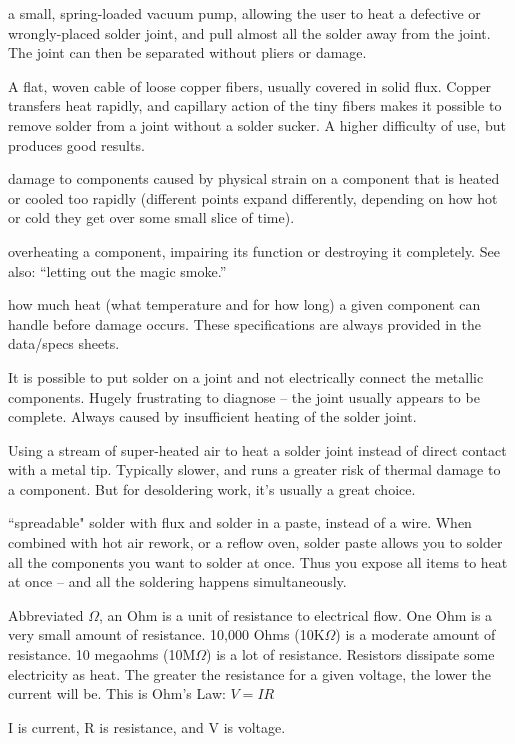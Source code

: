 \documentclass[12pt]{article}
\begin{document}
\begin{description}
 a small, spring-loaded vacuum pump, allowing the user to heat a defective or wrongly-placed solder joint, and pull almost all the solder away from the joint. The joint can then be separated without pliers or damage.

 A flat, woven cable of loose copper fibers, usually covered in solid flux. Copper transfers heat rapidly, and capillary action of the tiny fibers makes it possible to remove solder from a joint without a solder sucker. A higher difficulty of use, but produces good results.

 damage to components caused by physical strain on a component that is heated or cooled too rapidly (different points expand differently, depending on how hot or cold they get over some small slice of time).

 overheating a component, impairing its function or destroying it completely. See also: ``letting out the magic smoke.''

 how much heat (what temperature and for how long) a given component can handle before damage occurs. These specifications are always provided in the data/specs sheets.

 It is possible to put solder on a joint and not electrically connect the metallic components. Hugely frustrating to diagnose -- the joint usually appears to be complete. Always caused by insufficient heating of the solder joint. 

 Using a stream of super-heated air to heat a solder joint instead of direct contact with a metal tip. Typically slower, and runs a greater risk of thermal damage to a component. But for desoldering work, it's usually a great choice.

 ``spreadable" solder with flux and solder in a paste, instead of a wire. When combined with hot air rework, or a reflow oven, solder paste allows you to solder all the components you want to solder at once. Thus you expose all items to heat at once -- and all the soldering happens simultaneously.

\+[Ohm:] Abbreviated $\Omega$, an Ohm is a unit of resistance to electrical flow. One Ohm is a very small amount of resistance. 10,000 Ohms (10K$\Omega$) is a moderate amount of resistance. 10 megaohms (10M$\Omega$) is a lot of resistance. Resistors dissipate some electricity as heat. The greater the resistance for a given voltage, the lower the current will be. This is Ohm's Law: $V=IR$ 

I is current, R is resistance, and V is voltage.

\end{description}
\end{document}
